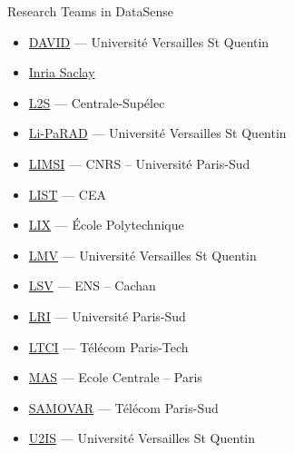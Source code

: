 \begin{frame}{Research Teams in DataSense}

\begin{itemize}
\item \href{http://.david.uvsq.fr/}{DAVID} --- Université Versailles St Quentin
\item \href{http://www.inria.fr/centre/saclay }{Inria Saclay}
\item \href{http://www.l2s.centralesupelec.fr/}{L2S} --- Centrale-Supélec
\item \href{http://www.uvsq.fr/laboratoire-d-informatique-parallelisme-reseaux-algorithmes-distribues-li-parad}{Li-PaRAD} --- Université Versailles St Quentin
\item \href{https://www.limsi.fr/fr/}{LIMSI} --- CNRS – Université Paris-Sud
\item \href{http://www-list.cea.fr/}{LIST} --- CEA
\item \href{http://www.lix.polytechnique.fr/}{LIX} --- École Polytechnique
\item \href{http://lmv.math.cnrs.fr/}{LMV} --- Université Versailles St Quentin
\item \href{http://www.lsv.ens-cachan.fr/}{LSV} --- ENS – Cachan
\item \href{http://www.lri.fr/}{LRI} --- Université Paris-Sud
\item \href{https://www.ltci.telecom-paristech.fr/}{LTCI} --- Télécom Paris-Tech
\item \href{http://www.mas.ecp.fr/}{MAS} --- Ecole Centrale – Paris
\item \href{http://www.samovar.telecom-sudparis.eu/}{SAMOVAR} --- Télécom Paris-Sud
\item \href{http://u2is.ensta-paristech.fr/}{U2IS} --- Université Versailles St Quentin
\end{itemize}
\end{frame}

